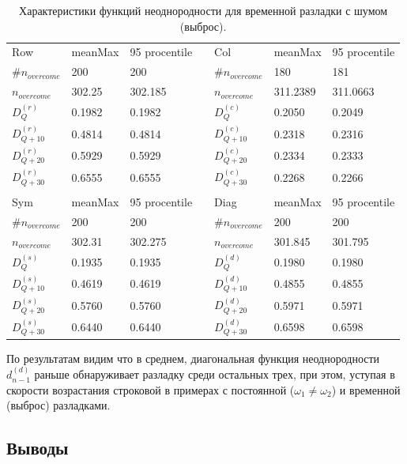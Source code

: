 \documentclass[specialist, substylefile = spbu.rtx,
			   subf, href, 12pt]{disser}
\begin{document}
\newpage
\begin{table}[!hhh]
	\caption{Характеристики функций неоднородности для временной разладки с шумом (выброс).}
	\begin{tabular}{lllllll}
		Row & meanMax & 95 procentile &  & Col & meanMax & 95 procentile \\
		$\#n_{overcome}$ & 200 & 200 &  & $\#n_{overcome}$ & 180 & 181 \\
		$n_{overcome}$ & 302.25 & 302.185 &  & $n_{overcome}$ & 311.2389 & 311.0663 \\
		$D_Q^{(r)}$ & 0.1982 & 0.1982 &  & $D_Q^{(c)}$ & 0.2050 & 0.2049 \\
		$D_{Q+10}^{(r)}$ & 0.4814 & 0.4814 &  & $D_{Q+10}^{(c)}$ & 0.2318 & 0.2316 \\
		$D_{Q+20}^{(r)}$ & 0.5929 & 0.5929 &  & $D_{Q+20}^{(c)}$ & 0.2334 & 0.2333 \\
		$D_{Q+30}^{(r)}$ & 0.6555 & 0.6555 &  & $D_{Q+30}^{(c)}$ & 0.2268 & 0.2266 \\
		&  &  &  &  &  &  \\
		Sym & meanMax & 95 procentile &  & Diag & meanMax & 95 procentile \\
		$\#n_{overcome}$ & 200 & 200 &  & $\#n_{overcome}$ & 200 & 200 \\
		$n_{overcome}$ & 302.31 & 302.275 &  & $n_{overcome}$ & 301.845 & 301.795 \\
		$D_Q^{(s)}$ & 0.1935 & 0.1935 &  & $D_Q^{(d)}$ & 0.1980 & 0.1980 \\
		$D_{Q+10}^{(s)}$ & 0.4619 & 0.4619 &  & $D_{Q+10}^{(d)}$ & 0.4855 & 0.4855 \\
		$D_{Q+20}^{(s)}$ & 0.5760 & 0.5760 &  & $D_{Q+20}^{(d)}$ & 0.5971 & 0.5971 \\
		$D_{Q+30}^{(s)}$ & 0.6440 & 0.6440 &  & $D_{Q+30}^{(d)}$ & 0.6598 & 0.6598
	\end{tabular}
	\label{tab:TemporaryHeterogeneityNoisedOutlier}
\end{table}

По результатам видим что в среднем, диагональная функция неоднородности $d_{n-1}^{(d)}$ раньше обнаруживает разладку среди остальных трех, при этом, уступая в скорости возрастания строковой в примерах с постоянной ($\omega_1 \neq \omega_2$) и временной (выброс) разладками. 

\newpage
\subsection{Выводы}
\end{document}
